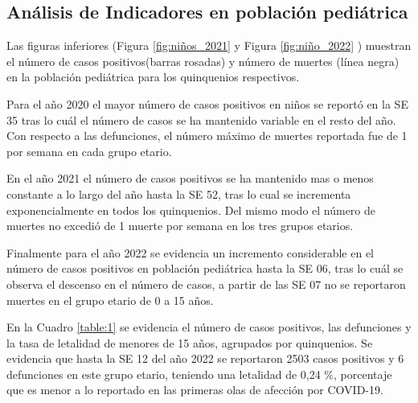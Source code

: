 \documentclass[12pt,a4paper,openany]{book}
\begin{document}
\subsection*{Análisis de Indicadores en población pediátrica}
\noindent Las figuras inferiores (Figura \ref{fig:niños_2021} y Figura \ref{fig:niño_2022} ) muestran el número de casos positivos(barras rosadas) y número de muertes (línea negra) en la población pediátrica para los quinquenios respectivos.

Para el año 2020 el mayor número de casos positivos en niños se reportó en la SE 35 tras lo cuál el número de casos se ha mantenido variable en el resto del año. Con respecto a las defunciones,  el número máximo de muertes reportada fue de 1 por semana en cada grupo etario. 

En el año 2021 el número de casos positivos se ha mantenido mas o menos constante a lo largo del año hasta la SE 52, tras lo cual se incrementa exponencialmente en todos los quinquenios. Del mismo modo el número de muertes no excedió de 1 muerte por semana en los tres grupos etarios.  

Finalmente para el año 2022 se evidencia un incremento considerable en 
el número de casos positivos en población pediátrica hasta la SE 06, tras lo cuál se observa el descenso en el número de casos, a partir de las SE 07 no se reportaron muertes en el grupo etario de 0 a 15 años.  


En la Cuadro \ref{table:1} se evidencia el número de casos positivos, las defunciones y la tasa de letalidad de menores de 15 años, agrupados por quinquenios. Se evidencia que hasta la SE 12 del año 2022 se reportaron 2503 casos positivos y 6 defunciones en este grupo etario, teniendo una letalidad de 0,24 $\%$, porcentaje que es menor a lo reportado en las primeras olas de afección por COVID-19.   
\end{document}
